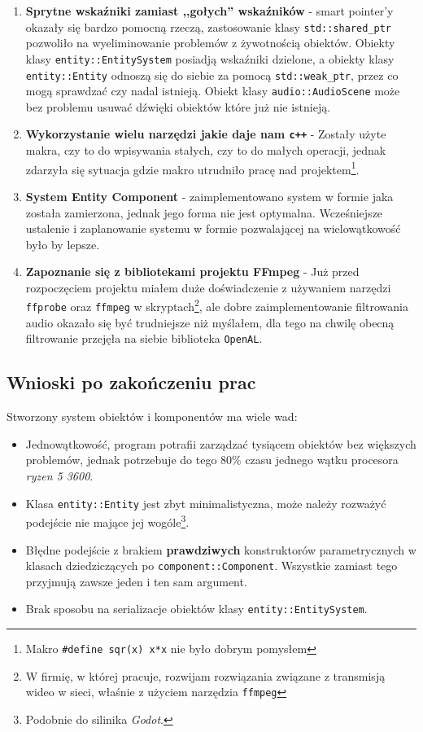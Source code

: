 \documentclass[a4paper,11pt]{article}
\begin{document}
\begin{enumerate}
    \item \textbf{Sprytne wskaźniki zamiast ,,gołych'' wskaźników} - smart pointer'y okazały się bardzo pomocną rzeczą, zastosowanie klasy \texttt{std::shared\_ptr} pozwoliło na wyeliminowanie problemów z żywotnością obiektów. Obiekty klasy \texttt{entity::EntitySystem} posiadją wskaźniki dzielone, a obiekty klasy \texttt{entity::Entity} odnoszą się do siebie za pomocą \texttt{std::weak\_ptr}, przez co mogą sprawdzać czy nadal istnieją. Obiekt klasy \texttt{audio::AudioScene} może bez problemu usuwać dźwięki obiektów które już nie istnieją.
    \item \textbf{Wykorzystanie wielu narzędzi jakie daje nam \texttt{c++}} - Zostały użyte makra, czy to do wpisywania stałych, czy to do małych operacji, jednak zdarzyła się sytuacja gdzie makro utrudniło pracę nad projektem\footnote{Makro \texttt{\#define sqr(x) x*x} nie było dobrym pomysłem}.
    \item \textbf{System Entity Component} - zaimplementowano system w formie jaka została zamierzona, jednak jego forma nie jest optymalna. Wcześniejsze ustalenie i zaplanowanie systemu w formie pozwalającej na wielowątkowość było by lepsze.
    \item \textbf{Zapoznanie się z bibliotekami projektu FFmpeg} - Już przed
        rozpoczęciem projektu miałem duże doświadczenie z używaniem narzędzi
        \texttt{ffprobe} oraz \texttt{ffmpeg} w skryptach\footnote{W firmię, w
        której pracuje, rozwijam rozwiązania związane z transmisją wideo w
        sieci, właśnie z użyciem narzędzia \texttt{ffmpeg}}, ale dobre zaimplementowanie filtrowania audio okazało się być trudniejsze niż myślałem, dla tego na chwilę obecną filtrowanie przejęła na siebie biblioteka \texttt{OpenAL}.
\end{enumerate}

\subsection{Wnioski po zakończeniu prac}

Stworzony system obiektów i komponentów ma wiele wad:
\begin{itemize}
    \item Jednowątkowość, program potrafii zarządzać tysiącem obiektów bez
        większych problemów, jednak potrzebuje do tego 80\% czasu jednego wątku
        procesora \emph{ryzen 5 3600}.
    \item Klasa \texttt{entity::Entity} jest zbyt minimalistyczna, może należy
        rozważyć podejście nie mające jej wogóle\footnote{Podobnie do silinika
        \emph{Godot}.}.
    \item Błędne podejście z brakiem \textbf{prawdziwych} konstruktorów
        parametrycznych w klasach dziedziczących po
        \texttt{component::Component}. Wszystkie zamiast tego przyjmują zawsze
        jeden i ten sam argument.
    \item Brak sposobu na serializacje obiektów klasy \texttt{entity::EntitySystem}.
\end{itemize}
\end{document}
